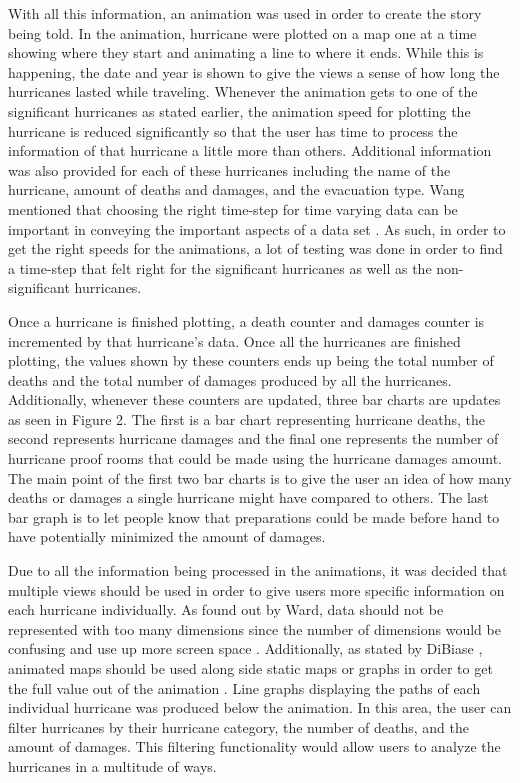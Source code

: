 With  all this information, an animation was used in order to create the story being told. In the animation, hurricane were plotted on a map one at a time showing where they start and animating a line to where it ends. While this is happening, the date and year is shown to give the views a sense of how long the hurricanes lasted while traveling. Whenever the animation gets to one of the significant hurricanes as stated earlier, the animation speed for plotting the hurricane is reduced significantly so that the user has time to process the information of that hurricane a little more than others. Additional information was also provided for each of these hurricanes including the name of the hurricane, amount of deaths and damages, and the evacuation type. Wang \etal mentioned that choosing the right time-step for time varying data can be important in conveying the important aspects of a data set \cite{wang2008importance}. As such, in order to get the right speeds for the animations, a lot of testing was done in order to find a time-step that felt right for the significant hurricanes as well as the non-significant hurricanes.

Once a hurricane is finished plotting, a death counter and damages counter is incremented by that hurricane's data. Once all the hurricanes are finished plotting, the values shown by these counters ends up being the total number of deaths and the total number of damages produced by all the hurricanes. Additionally, whenever these counters are updated, three bar charts are updates as seen in Figure 2. The first is a bar chart representing hurricane deaths, the second represents hurricane damages and the final one represents the number of hurricane proof rooms that could be made using the hurricane damages amount. The main point of the first two bar charts is to give the user an idea of how many deaths or damages a single hurricane might have compared to others. The last bar graph is to let people know that preparations could be made before hand to have potentially minimized the amount of damages.

\bars

Due to all the information being processed in the animations, it was decided that multiple views should be used in order to give users more specific information on each hurricane individually. As found out by Ward, data should not be represented with too many dimensions since the number of dimensions would be confusing and use up more screen space \cite{ward1994xmdvtool}. Additionally, as stated by DiBiase \etal, animated maps should be used along side static maps or graphs in order to get the full value out of the animation \cite{dibiase1992animation}.  Line graphs displaying the paths of each individual hurricane was produced below the animation. In this area, the user can filter hurricanes by their hurricane category, the number of deaths, and the amount of damages. This filtering functionality would allow users to analyze the hurricanes in a multitude of ways. 

